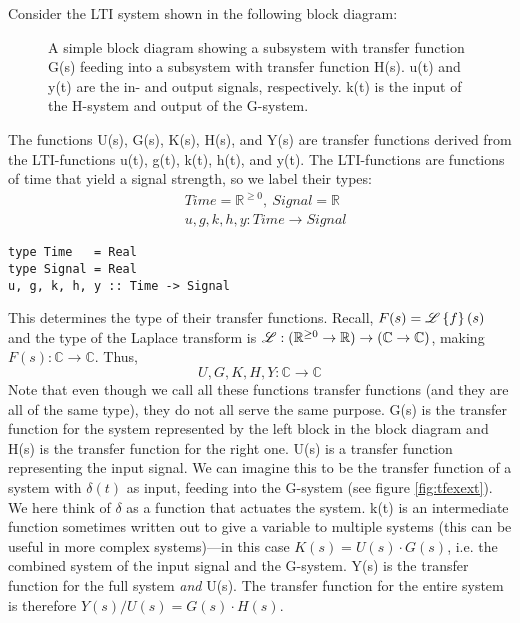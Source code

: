 Consider the LTI system shown in the following block diagram:


\begin{figure}[H]
\centering
{}
\caption{A simple block diagram showing a subsystem with transfer function G(s) feeding into a subsystem with transfer function H(s). u(t) and y(t) are the in- and output signals, respectively. k(t) is the input of the H-system and output of the G-system.}
\label{fig:tfex}
\end{figure}
The functions U(s), G(s), K(s), H(s), and Y(s) are transfer functions derived from the LTI-functions u(t), g(t), k(t), h(t), and y(t). 
The LTI-functions are functions of time that yield a signal strength, so we label their types:
\begin{align*}
    &Time = \mathbb{R}^{\geq 0},~ Signal = \mathbb{R} \\
    &u, g, k, h, y : Time \rightarrow Signal
\end{align*}
\begin{verbatim}
type Time   = Real
type Signal = Real
u, g, k, h, y :: Time -> Signal
\end{verbatim}
This determines the type of their transfer functions. Recall, $F(s)=\mathscr{L}\left\{f\right\}(s)$ and the type of the Laplace transform is $\mathscr{L} : (\mathbb{R}^{\geq 0}\rightarrow\mathbb{R})\rightarrow(\mathbb{C}\rightarrow\mathbb{C})$, making $F(s) : \mathbb{C}\rightarrow\mathbb{C}$. Thus, 
\begin{equation*}
    U, G, K, H, Y : \mathbb{C} \rightarrow \mathbb{C}
\end{equation*}
Note that even though we call all these functions transfer functions (and they are all of the same type), they do not all serve the same purpose. G(s) is the transfer function for the system represented by the left block in the block diagram and H(s) is the transfer function for the right one. U(s) is a transfer function representing the input signal. We can imagine this to be the transfer function of a system with $\delta(t)$ as input, feeding into the G-system (see figure \ref{fig:tfexext}). We here think of $\delta$ as a function that actuates the system. k(t) is an intermediate function sometimes written out to give a variable to multiple systems (this can be useful in more complex systems)---in this case $K(s)=U(s)\cdot G(s)$, i.e. the combined system of the input signal and the G-system. Y(s) is the transfer function for the full system \textit{and} U(s). The transfer function for the entire system is therefore $Y(s)/U(s)=G(s)\cdot H(s)$.
